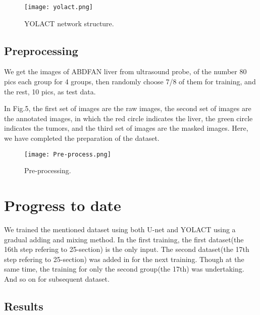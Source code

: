 \documentclass[12pt, a4paper]{article}
\begin{document}
\begin{figure}[tbh]
	\centering
	\texttt{[image: yolact.png]}
	\vspace*{-1mm}
	\caption{YOLACT network structure.}
	\label{fig: fig1}
\end{figure}

\subsection{Preprocessing}

We get the images of ABDFAN liver from ultrasound probe, of the number 80 pics each group for 4 groups, then randomly choose 7/8 of them for training, and the rest, 10 pics, as test data.

In Fig.5, the first set of images are the raw images, the second set of images are the annotated images, in which the red circle indicates the liver, the green circle indicates the tumors, and the third set of images are the masked images. Here, we have completed the preparation of the dataset.

\begin{figure}[tbh]
	\centering
	\texttt{[image: Pre-process.png]}
	\vspace*{-1mm}
	\caption{Pre-processing.}
	\label{fig: fig1}
\end{figure}

\section{Progress to date}

We trained the mentioned dataset using both U-net and YOLACT using a gradual adding and mixing method. In the first training, the first dataset(the 16th step refering to 25-section) is the only input. The second dataset(the 17th step refering to 25-section) was added in for the next training. Though at the same time, the training for only the second group(the 17th) was undertaking. And so on for subsequent dataset.



\subsection{Results}
\end{document}

